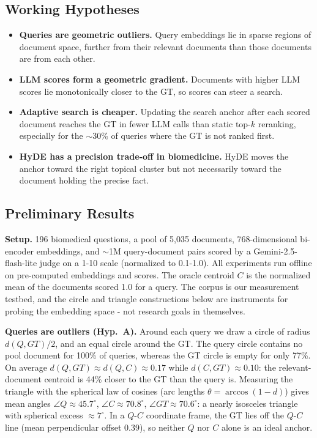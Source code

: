 \documentclass[11pt,a4paper]{article}
\begin{document}
\subsection{Working Hypotheses}
\begin{itemize}
  \item[\textbf{A.}] \textbf{Queries are geometric outliers.} Query embeddings lie in sparse regions of document space, further from their relevant documents than those documents are from each other.
  \item[\textbf{B.}] \textbf{LLM scores form a geometric gradient.} Documents with higher LLM scores lie monotonically closer to the GT, so scores can steer a search.
  \item[\textbf{C.}] \textbf{Adaptive search is cheaper.} Updating the search anchor after each scored document reaches the GT in fewer LLM calls than static top-$k$ reranking, especially for the $\sim$30\% of queries where the GT is not ranked first.
  \item[\textbf{D.}] \textbf{HyDE has a precision trade-off in biomedicine.} HyDE moves the anchor toward the right topical cluster but not necessarily toward the document holding the precise fact.
\end{itemize}

\subsection{Preliminary Results}
\textbf{Setup.} 196 biomedical questions, a pool of 5,035 documents, 768-dimensional bi-encoder embeddings, and $\sim$1M query-document pairs scored by a Gemini-2.5-flash-lite judge on a 1-10 scale (normalized to 0.1-1.0). All experiments run offline on pre-computed embeddings and scores. The oracle centroid $C$ is the normalized mean of the documents scored 1.0 for a query. The corpus is our measurement testbed, and the circle and triangle constructions below are instruments for probing the embedding space - not research goals in themselves.

\textbf{Queries are outliers (Hyp.~A).} Around each query we draw a circle of radius $d(Q,GT)/2$, and an equal circle around the GT. The query circle contains no pool document for 100\% of queries, whereas the GT circle is empty for only 77\%. On average $d(Q,GT)\approx d(Q,C)\approx 0.17$ while $d(C,GT)\approx 0.10$: the relevant-document centroid is 44\% closer to the GT than the query is. Measuring the triangle with the spherical law of cosines (arc lengths $\theta = \arccos(1-d)$) gives mean angles $\angle Q\approx45.7^\circ$, $\angle C\approx70.8^\circ$, $\angle GT\approx70.6^\circ$: a nearly isosceles triangle with spherical excess $\approx7^\circ$. In a $Q$-$C$ coordinate frame, the GT lies off the $Q$-$C$ line (mean perpendicular offset 0.39), so neither $Q$ nor $C$ alone is an ideal anchor.
\end{document}
